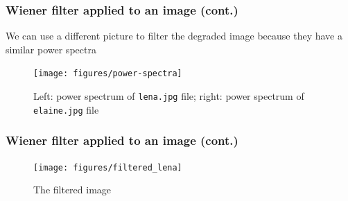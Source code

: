 \documentclass[10pt]{beamer}
\begin{document}
\begin{frame}
  \frametitle{Wiener filter applied to an image (cont.)}
  We can use a different picture to filter the degraded image because they have
  a similar power spectra
  \begin{figure}
    \centering
    \texttt{[image: figures/power-spectra]}
    \caption{Left: power spectrum of \texttt{lena.jpg} file; right: power
      spectrum of \texttt{elaine.jpg} file}
  \end{figure}
\end{frame}

\begin{frame}
  \frametitle{Wiener filter applied to an image (cont.)}
  \begin{figure}
    \centering
    \texttt{[image: figures/filtered\_lena]}
    \caption{The filtered image}
  \end{figure}
\end{frame}
\end{document}
